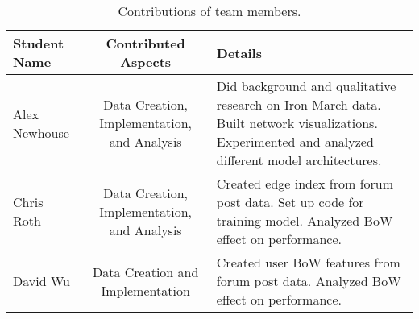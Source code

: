 \documentclass[10pt,twocolumn,letterpaper]{article}
\begin{document}
\begin{table*}
\begin{center} 
\begin{tabular}{|l|c|p{8cm}|}
\hline
Student Name & Contributed Aspects & Details \\
\hline\hline
Alex Newhouse & Data Creation, Implementation, and Analysis & Did background and qualitative research on Iron March data. Built network visualizations. Experimented and analyzed different model architectures. \\
Chris Roth & Data Creation, Implementation, and Analysis & Created edge index from forum post data. Set up code for training model. Analyzed BoW effect on performance. \\
David Wu & Data Creation and Implementation & Created user BoW features from forum post data. Analyzed BoW effect on performance. \\
\hline
\end{tabular}
\end{center}
\caption{Contributions of team members.}
\label{tab:contributions}
\end{table*}









\end{document}
